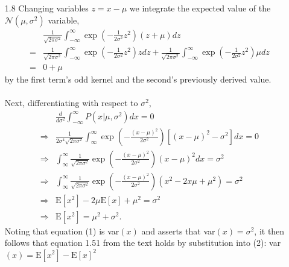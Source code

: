 \documentclass[]{article}
\begin{document}
\begin{enumerate}
	\item[1.8] Changing variables $z = x-\mu$ we integrate the expected value of the $\mathcal{N}(\mu, \sigma^2)$ variable,
	\begin{align*}
		& \frac{1}{\sqrt{2 \pi \sigma^2}} \int_{-\infty}^{\infty}  \exp \left( -\frac{1}{2 \sigma^2}z^2 \right) (z+\mu) dz \\
		=& \frac{1}{\sqrt{2 \pi \sigma^2}} \int_{-\infty}^{\infty}  \exp \left( -\frac{1}{2 \sigma^2}z^2 \right) z dz + \frac{1}{\sqrt{2 \pi \sigma^2}} \int_{-\infty}^{\infty}  \exp \left( -\frac{1}{2 \sigma^2}z^2 \right) \mu dz \\
		=& 0 + \mu
	\end{align*}
 	by the first term's odd kernel and the second's previously derived value. \\ \\
 	Next, differentiating with respect to $\sigma^2$,
 	\begin{align*}
 	& \frac{d}{d\sigma^2} \int_{-\infty}^{\infty} P(x | \mu, \sigma^2)dx = 0 \\
 	\Rightarrow & \frac{1}{2 \sigma^4 \sqrt{2\pi \sigma^2}} \int_{\infty}^{\infty} \exp \left(- \frac{(x - \mu)^2}{2 \sigma^2} \right) \left[ (x - \mu)^2 - \sigma^2 \right] dx  = 0 \\
 	\Rightarrow & \int_{\infty}^{\infty} \frac{1}{\sqrt{2 \pi \sigma^2}} \exp\left( - \frac{(x - \mu)^2}{2 \sigma^2} \right) \left( x - \mu \right)^2 dx = \sigma^2 \tag{1}  \\
 	\Rightarrow &  \int_{\infty}^{\infty} \frac{1}{\sqrt{2 \pi \sigma^2}} \exp\left( - \frac{(x - \mu)^2}{2 \sigma^2} \right) \left( x^2 - 2x \mu + \mu^2 \right) = \sigma^2 \\
 	\Rightarrow & \text{E}\left[x^2\right] - 2\mu \text{E}\left[x\right] + \mu^2 = \sigma^2 \\
 	\Rightarrow & \text{E}\left[x^2\right] = \mu^2 + \sigma^2. \tag{2}
 	\end{align*}
 	Noting that equation (1) is var$(x)$ and asserts that var$(x)=\sigma^2$, it then follows that equation 1.51 from the text holds by substitution into (2): var$(x) = \text{E}[x^2] - \text{E}[x]^2$
 	

\end{enumerate}
\end{document}
